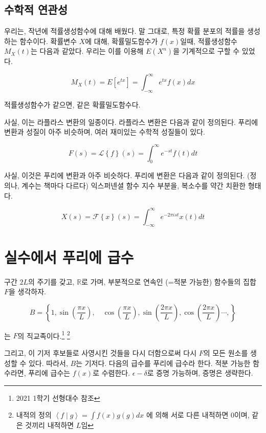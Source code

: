 \documentclass[article, oneside]{oblivoir}
\begin{document}
\subsection{수학적 연관성}

우리는, 작년에 적률생성함수에 대해 배웠다. 말 그대로, 특정 확률 분포의 적률을 생성하는 함수이다. 확률변수 $X$에 대해, 확률밀도함수가 $f(x)$일때, 적률생성함수 $M_X(t)$는 다음과 같았다. 우리는 이를 이용해 $E(X^n)$을 기계적으로 구할 수 있었다.

\begin{equation}
    M_X(t) = E[e^{tx}] = \int_{-\infty}^{\infty} e^{tx} f(x) dx
\end{equation}

적률생성함수가 같으면, 같은 확률밀도함수다.

사실, 이는 라플라스 변환의 일종이다. 라플라스 변환은 다음과 같이 정의된다. 푸리에 변환과 성질이 아주 비슷하며, 여러 재미있는 수학적 성질들이 있다.


\begin{equation}
    F(s) = \mathcal{L}\left\{f\right\}(s) = \int_0^{\infty}e^{-st} f(t) dt
\end{equation}

사실, 이것은 푸리에 변환과 아주 비슷하다. 푸리에 변환은 다음과 같이 정의된다. (정의나, 계수는 책마다 다르다) 익스퍼넨셜 함수 지수 부분을, 복소수를 약간 치환한 형태다. 

\begin{equation}
    X(s) = \mathcal{F}\left\{x\right\}(s) = \int_{-\infty}^{\infty}e^{-2 \pi i s t} x(t) dt
\end{equation}



\section{실수에서 푸리에 급수}
구간 $2L$의 주기를 갖고, $\mathbb{R}$로 가며, 부분적으로 연속인 (=적분 가능한) 함수들의 집합 $F$을 생각하자.

$$B = \left\{1, \sin \left(\frac{\pi x}{L}\right), \quad \cos \left(\frac{\pi x}{L}\right), \sin \left(\frac{2 \pi x}{L}\right),  \cos \left(\frac{2 \pi x}{L}\right) \cdots, \right\}$$

는 $F$의 직교족이다.\footnote{2021 1학기 선형대수 참조} \footnote{내적의 정의 $\left\langle f\mid g\right\rangle = \int f(x) g(g) dx $ 에 의해 서로 다른 내적하면 0이며, 같은 것끼리 내적하면 $L$임}


그리고, 이 기저 후보들로 사영시킨 것들을 다시 더함으로써 다시 $F$의 모든 원소를 생성할 수 있다. 따라서, $B$는 기저다. 다음의 급수를 푸리에 급수라 한다. 적분 가능한 함수라면, 푸리에 급수는 $f(x)$로 수렴한다. $\epsilon-\delta$로 증명 가능하며, 증명은 생략한다.
\end{document}
